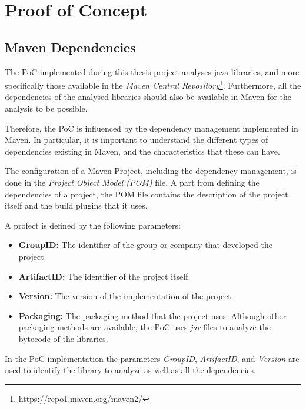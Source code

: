 \chapter{Proof of Concept}\label{ch:PoC}

\section{Maven Dependencies}
The PoC implemented during this thesis project analyses java libraries, and more specifically those available in the \textit{Maven Central Repository}\footnote{\url{https://repo1.maven.org/maven2/}}. Furthermore, all the dependencies of the analysed libraries should also be available in Maven for the analysis to be possible.

Therefore, the PoC is influenced by the dependency management implemented in Maven. In particular, it is important to understand the different types of dependencies existing in Maven, and the characteristics that these can have.

The configuration of a Maven Project, including the dependency management, is done in the \textit{Project Object Model (POM)} file. A part from defining the dependencies of a project, the POM file contains the description of the project itself and the build plugins that it uses.

A profect is defined by the following parameters:

\begin{itemize}
  \item \textbf{GroupID:} The identifier of the group or company that developed the project.
  \item \textbf{ArtifactID:} The identifier of the project itself.
  \item \textbf{Version:} The version of the implementation of the project.
  \item \textbf{Packaging:} The packaging method that the project uses. Although other packaging methods are available, the PoC uses \textit{jar} files to analyze the bytecode of the libraries.
\end{itemize}

In the PoC implementation the parameters \textit{GroupID}, \textit{ArtifactID}, and \textit{Version} are used to identify the library to analyze as well as all the dependencies.

